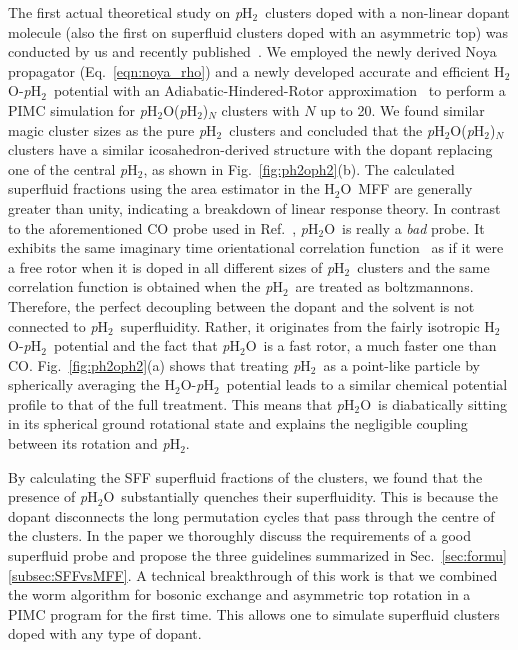 \documentclass[12pt]{iopart}
\newcommand{\water}{H$_2$O}
\newcommand{\pwater}{{\em p}H$_2$O}
\newcommand{\phtwo}{{\em p}H$_2$}
\begin{document}
The first actual theoretical study on \phtwo~clusters doped with a non-linear dopant molecule (also the first on superfluid clusters doped with an asymmetric top) was conducted by us and recently published~\cite{tobywater}. 
We employed the newly derived Noya propagator (Eq.~\ref{eqn:noya_rho}) and a newly developed accurate and efficient \water-\phtwo~potential with an Adiabatic-Hindered-Rotor approximation~\cite{zeng_ahr_pot} to perform a PIMC simulation for \pwater(\phtwo)$_N$ clusters with $N$ up to 20. 
We found similar magic cluster sizes as the pure \phtwo~clusters and concluded that the \pwater(\phtwo)$_N$ clusters have a similar icosahedron-derived structure with the dopant replacing one of the central \phtwo, as shown in Fig.~\ref{fig:ph2oph2}(b). 
The calculated superfluid fractions using the area estimator in the \water~MFF are generally greater than unity, indicating a breakdown of  linear response theory. 
In contrast to the aforementioned CO probe used in Ref.~\cite{raston_coh2_superfluid}, \pwater~is really a {\em bad} probe. 
It exhibits the same imaginary time orientational correlation function~\cite{blinov_RCF} as if it were a free rotor when it is doped in all different sizes of \phtwo~clusters and the same correlation function is obtained when the \phtwo~are treated as boltzmannons. Therefore, the perfect decoupling between the dopant and the solvent is not connected to \phtwo~superfluidity. 
Rather, it originates from the fairly isotropic \water-\phtwo~potential and the fact that \pwater~is a fast rotor, a much faster one than CO. 
Fig.~\ref{fig:ph2oph2}(a) shows that treating \phtwo~as a point-like particle by spherically averaging the \water-\phtwo~potential leads to a similar chemical potential profile to that of the full treatment. 
This means that \pwater~is diabatically sitting in its spherical ground rotational state and explains the negligible coupling between its rotation and  \phtwo.

By calculating the SFF superfluid fractions of the clusters, we found that the presence of \pwater~substantially quenches their superfluidity. This is because the dopant disconnects the long permutation cycles that pass through the centre of the clusters. 
In the paper we thoroughly discuss the requirements of a good superfluid probe and propose the three guidelines summarized in Sec.~\ref{sec:formu}\ref{subsec:SFFvsMFF}. A technical breakthrough of this work is that we combined the worm algorithm for bosonic exchange and asymmetric top rotation in a PIMC program for the first time.
This allows one to simulate superfluid clusters doped with any type of dopant.
\end{document}
